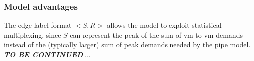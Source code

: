 \subsubsection{Model advantages}
The edge label format $<S, R>$ allows the model to exploit statistical multiplexing, since $S$ can represent the peak of the sum of \gls{vm}-to-\gls{vm} demands instead of the (typically larger) sum of peak demands needed by the pipe model.
\textbf{\textit{TO BE CONTINUED}} ... %



